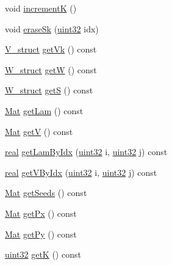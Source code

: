 \begin{DoxyCompactItemize}
\item 
void \mbox{\hyperlink{classvd_a59c1f5756af7de9cc7a0089221cbd5b7}{incrementK}} ()
\item 
void \mbox{\hyperlink{classvd_ab5a972992406d5c42d1398573d9c769a}{erase\+Sk}} (\mbox{\hyperlink{typedefs_8h_a8ad23e2333787a214e20a58a284a5a60}{uint32}} idx)
\item 
\mbox{\hyperlink{structV__struct}{V\+\_\+struct}} \mbox{\hyperlink{classvd_a090bebdbbff36888934c870daf3dcb36}{get\+Vk}} () const
\item 
\mbox{\hyperlink{structW__struct}{W\+\_\+struct}} \mbox{\hyperlink{classvd_ab4d0d9ea76cedf1a6825b62c9ec2d118}{getW}} () const
\item 
\mbox{\hyperlink{structW__struct}{W\+\_\+struct}} \mbox{\hyperlink{classvd_a7f901e0c6d226b81f262c2363a69844a}{getS}} () const
\item 
\mbox{\hyperlink{typedefs_8h_a9fa28c1f74e909474857584f5c7b0088}{Mat}} \mbox{\hyperlink{classvd_a37c4ab12669eb276fe7fa4a610310345}{get\+Lam}} () const
\item 
\mbox{\hyperlink{typedefs_8h_a9fa28c1f74e909474857584f5c7b0088}{Mat}} \mbox{\hyperlink{classvd_aad4ea5c045b8380f83b0490af2fee0fa}{getV}} () const
\item 
\mbox{\hyperlink{typedefs_8h_a58a0c7cf2501f4492da833421be92547}{real}} \mbox{\hyperlink{classvd_a5c26b069f893aa82eeaf53ff608eda1f}{get\+Lam\+By\+Idx}} (\mbox{\hyperlink{typedefs_8h_a8ad23e2333787a214e20a58a284a5a60}{uint32}} i, \mbox{\hyperlink{typedefs_8h_a8ad23e2333787a214e20a58a284a5a60}{uint32}} j) const
\item 
\mbox{\hyperlink{typedefs_8h_a58a0c7cf2501f4492da833421be92547}{real}} \mbox{\hyperlink{classvd_a640ed20e4618abd409e180a707eea3b1}{get\+V\+By\+Idx}} (\mbox{\hyperlink{typedefs_8h_a8ad23e2333787a214e20a58a284a5a60}{uint32}} i, \mbox{\hyperlink{typedefs_8h_a8ad23e2333787a214e20a58a284a5a60}{uint32}} j) const
\item 
\mbox{\hyperlink{typedefs_8h_a9fa28c1f74e909474857584f5c7b0088}{Mat}} \mbox{\hyperlink{classvd_a82f353c594c3c6b24f6077398f059d3a}{get\+Seeds}} () const
\item 
\mbox{\hyperlink{typedefs_8h_a9fa28c1f74e909474857584f5c7b0088}{Mat}} \mbox{\hyperlink{classvd_aeba6d318016c8f8b9537ce4c0314f8cd}{get\+Px}} () const
\item 
\mbox{\hyperlink{typedefs_8h_a9fa28c1f74e909474857584f5c7b0088}{Mat}} \mbox{\hyperlink{classvd_a9738711704b1d03cdbe027b1976cb0c6}{get\+Py}} () const
\item 
\mbox{\hyperlink{typedefs_8h_a8ad23e2333787a214e20a58a284a5a60}{uint32}} \mbox{\hyperlink{classvd_ae145808dbbebfc984811eb48a6a57585}{getK}} () const

\end{DoxyCompactItemize}
